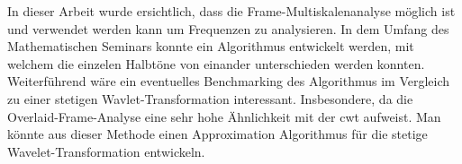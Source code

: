 

In dieser Arbeit wurde ersichtlich, dass die Frame-Multiskalenanalyse möglich ist und verwendet werden kann um Frequenzen zu analysieren. In dem Umfang des Mathematischen Seminars konnte ein Algorithmus entwickelt werden, mit welchem die einzelen Halbtöne von einander unterschieden werden konnten. Weiterführend wäre ein eventuelles Benchmarking des Algorithmus im Vergleich zu einer stetigen Wavlet-Transformation interessant. Insbesondere, da die Overlaid-Frame-Analyse eine sehr hohe Ähnlichkeit mit der cwt aufweist. Man könnte aus dieser Methode einen Approximation Algorithmus für die stetige Wavelet-Transformation entwickeln. 